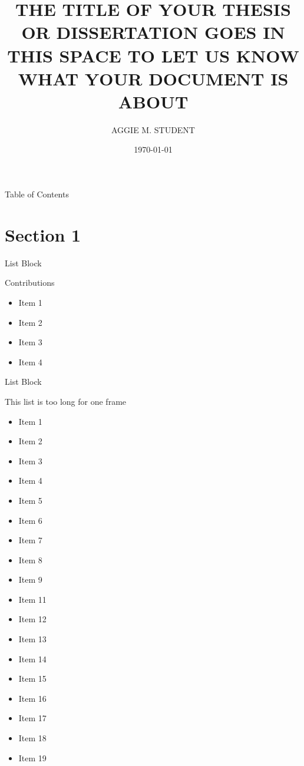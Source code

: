 \documentclass[10pt,compress]{beamer}
\title[Texas A\&M University]{THE TITLE OF YOUR THESIS OR DISSERTATION GOES IN THIS SPACE TO LET US KNOW WHAT YOUR DOCUMENT IS ABOUT}
\author[AGGIE M. STUDENT]{AGGIE M. STUDENT}
\institute[] %
{
  \emph{Mechanical Engineering Ph.D. Candidate} \newline
  Texas A\&M University, College Station, TX
}
\date{\today}
\begin{document}
\begin{frame}
    \titlepage
\end{frame}

\begin{frame}{Table of Contents}
    \tableofcontents[
        sectionstyle=show/show,
        subsectionstyle=hide/hide/hide
    ]
\end{frame}

\section{Section 1}

\begin{frame}{List Block}

    \begin{block}{Contributions}
        \begin{itemize}
            \item Item 1
            \item Item 2
            \item Item 3
            \item Item 4
        \end{itemize}
    \end{block}

\end{frame}


\begin{frame}[allowframebreaks]{List Block}

    This list is too long for one frame

    \begin{itemize}
        \item Item 1
        \item Item 2
        \item Item 3
        \item Item 4
        \item Item 5
        \item Item 6
        \item Item 7
        \item Item 8
        \item Item 9
        \item Item 11
        \item Item 12
        \item Item 13
        \item Item 14
        \item Item 15
        \item Item 16
        \item Item 17
        \item Item 18
        \item Item 19
    \end{itemize}

\end{frame}
\end{document}
